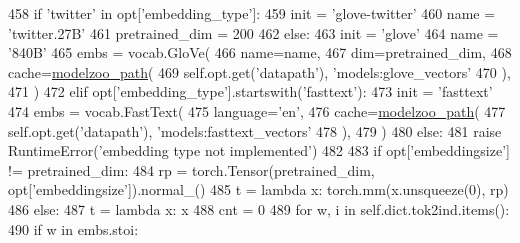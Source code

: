 \begin{DoxyCode}
458                     \textcolor{keywordflow}{if} \textcolor{stringliteral}{'twitter'} \textcolor{keywordflow}{in} opt[\textcolor{stringliteral}{'embedding\_type'}]:
459                         init = \textcolor{stringliteral}{'glove-twitter'}
460                         name = \textcolor{stringliteral}{'twitter.27B'}
461                         pretrained\_dim = 200
462                     \textcolor{keywordflow}{else}:
463                         init = \textcolor{stringliteral}{'glove'}
464                         name = \textcolor{stringliteral}{'840B'}
465                     embs = vocab.GloVe(
466                         name=name,
467                         dim=pretrained\_dim,
468                         cache=\hyperlink{namespaceparlai_1_1agents_1_1legacy__agents_1_1seq2seq_1_1utils__v0_a5fbd3301b67f00d6d146fb01c7cd7626}{modelzoo\_path}(
469                             self.opt.get(\textcolor{stringliteral}{'datapath'}), \textcolor{stringliteral}{'models:glove\_vectors'}
470                         ),
471                     )
472                 \textcolor{keywordflow}{elif} opt[\textcolor{stringliteral}{'embedding\_type'}].startswith(\textcolor{stringliteral}{'fasttext'}):
473                     init = \textcolor{stringliteral}{'fasttext'}
474                     embs = vocab.FastText(
475                         language=\textcolor{stringliteral}{'en'},
476                         cache=\hyperlink{namespaceparlai_1_1agents_1_1legacy__agents_1_1seq2seq_1_1utils__v0_a5fbd3301b67f00d6d146fb01c7cd7626}{modelzoo\_path}(
477                             self.opt.get(\textcolor{stringliteral}{'datapath'}), \textcolor{stringliteral}{'models:fasttext\_vectors'}
478                         ),
479                     )
480                 \textcolor{keywordflow}{else}:
481                     \textcolor{keywordflow}{raise} RuntimeError(\textcolor{stringliteral}{'embedding type not implemented'})
482 
483                 \textcolor{keywordflow}{if} opt[\textcolor{stringliteral}{'embeddingsize'}] != pretrained\_dim:
484                     rp = torch.Tensor(pretrained\_dim, opt[\textcolor{stringliteral}{'embeddingsize'}]).normal\_()
485                     t = \textcolor{keyword}{lambda} x: torch.mm(x.unsqueeze(0), rp)
486                 \textcolor{keywordflow}{else}:
487                     t = \textcolor{keyword}{lambda} x: x
488                 cnt = 0
489                 \textcolor{keywordflow}{for} w, i \textcolor{keywordflow}{in} self.dict.tok2ind.items():
490                     \textcolor{keywordflow}{if} w \textcolor{keywordflow}{in} embs.stoi:

\end{DoxyCode}
